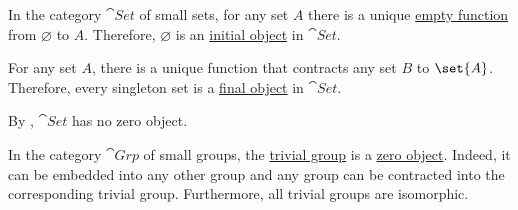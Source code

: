 \begin{example}\label{ex:def:zero_objects}
  In the category \hyperref[def:category_of_small_sets]{\( \cat{Set} \)} of small sets, for any set \( A \) there is a unique \hyperref[def:multi_valued_function/empty]{empty function} from \( \varnothing \) to \( A \). Therefore, \( \varnothing \) is an \hyperref[def:zero_objects/initial]{initial object} in \( \cat{Set} \).

  For any set \( A \), there is a unique function that contracts any set \( B \) to \( \set{ A } \). Therefore, every singleton set is a \hyperref[def:zero_objects/final]{final object} in \( \cat{Set} \).

  By , \( \cat{Set} \) has no zero object.

  In the category \hyperref[def:group/category]{\( \cat{Grp} \)} of small groups, the \hyperref[def:group/trivial]{trivial group} is a \hyperref[def:zero_objects/zero]{zero object}. Indeed, it can be embedded into any other group and any group can be contracted into the corresponding trivial group. Furthermore, all trivial groups are isomorphic.
\end{example}

